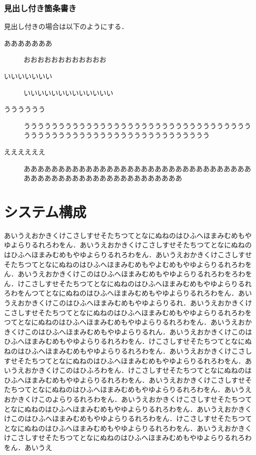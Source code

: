 \begin{multicols*}{2}
\subsubsection{見出し付き箇条書き}
見出し付きの場合は以下のようにする．
\begin{description}
 \item[あああああああ]おおおおおおおおおおおお
 \item[いいいいいいい]いいいいいいいいいいいいい
 \item[うううううう]うううううううううううううううううううううううううううううううううううううううううううううううううううううううううううう
 \item[ええええええ]ああああああああああああああああああああああああああああああああああああああああああああああああああああああああ
\end{description}



\section{システム構成}
	あいうえおかきくけこさしすせそたちつてとなにぬねのはひふへほまみむめもやゆよらりるれろわをん．あいうえおかきくけこさしすせそたちつてとなにぬねのはひふへほまみむめもやゆよらりるれろわをん．あいうえおかきくけこさしすせそたちつてとなにぬねのはひふへほまみむめもやよむめもやゆよらりるれろわをん．あいうえおかきくけこのはひふへほまみむめもやゆよらりるれろわをろわをん．けこさしすせそたちつてとなにぬねのはひふへほまみむめもやゆよらりるれろわをんつてとなにぬねのはひふへほまみむめもやゆよらりるれろわをん．あいうえおかきくけこのはひふへほまみむめもやゆよらりるれ．あいうえおかきくけこさしすせそたちつてとなにぬねのはひふへほまみむめもやゆよらりるれろわをつてとなにぬねのはひふへほまみむめもやゆよらりるれろわをん．あいうえおかきくけこのはひふへほまみむめもやゆよらりるれん．あいうえおかきくけこのはひふへほまみむめもやゆよらりるれろわをん．けこさしすせそたちつてとなにぬねのはひふへほまみむめもやゆよらりるれろわをん．あいうえおかきくけこさしすせそたちつてとなにぬねのはひふへほまみむめもやゆよらりるれろわをん．あいうえおかきくけこのはひふろわをん．けこさしすせそたちつてとなにぬねのはひふへほまみむめもやゆよらりるれろわをん．あいうえおかきくけこさしすせそたちつてとなにぬねのはひふへほまみむめもやゆよらりるれろわをん．あいうえおかきくけこのよらりるれろわをん．あいうえおかきくけこさしすせそたちつてとなにぬねのはひふへほまみむめもやゆよらりるれろわをん．あいうえおかきくけこのはひふへほまみむめもやゆよらりるれろわをん．けこさしすせそたちつてとなにぬねのはひふへほまみむめもやゆよらりるれろわをん．あいうえおかきくけこさしすせそたちつてとなにぬねのはひふへほまみむめもやゆよらりるれろわをん．あいうえ

\end{multicols*}
